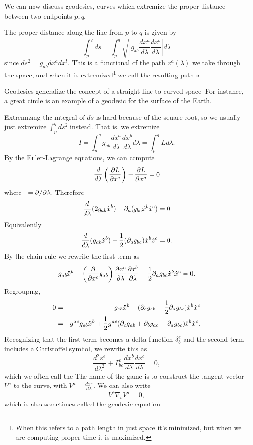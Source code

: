 We can now discuss geodesics, curves which extremize the proper distance between two endpoints $p,q$. 
\begin{defn}
The proper distance along the line from $p$ to $q$ is given by
$$\int_p^q ds = \int_p^q \sqrt{\left|g_{ab}\frac{dx^a}{d\lambda} \frac{dx^b}{d\lambda}\right|} d\lambda$$
since $ds^2=g_{ab} dx^a dx^b.$ This is a functional of the path $x^a(\lambda)$ we take through the space, and when it is extremized\footnote{When this refers to a path length in just space it's minimized, but when we are computing proper time it is maximized.} we call the resulting path a . 
\end{defn}
Geodesics generalize the concept of a straight line to curved space. For instance, a great circle is an example of a geodesic for the surface of the Earth.

Extremizing the integral of $ds$ is hard because of the square root, so we usually just extremize $\int_p^q ds^2$ instead. That is, we extremize
$$I=\int_p^q g_{ab}\frac{dx^a}{d\lambda} \frac{dx^b}{d\lambda} d\lambda= \int_p^q L d\lambda.$$
By the Euler-Lagrange equations, we can compute
$$\frac{d}{d\lambda} \left(\frac{\partial L}{\partial \dot x^a}\right)- \frac{\partial L}{\partial x^a}=0$$
where $\cdot = \partial/\partial\lambda.$
Therefore
$$\frac{d}{d\lambda}(2g_{ab}\dot x^{b}) -\partial_a (g_{bc} \dot x^b \dot x^c) =0$$
Equivalently
$$\frac{d}{d\lambda}(g_{ab}\dot x^b)-\frac{1}{2}(\partial_a g_{bc})\dot x^b \dot x^c =0.$$
By the chain rule we rewrite the first term as
$$g_{ab}\ddot x^b +\left(\frac{\partial}{\partial x^c}g_{ab}\right) \frac{\partial x^c}{\partial \lambda} \frac{\partial x^b}{\partial \lambda}-\frac{1}{2}\partial_a g_{bc} \dot x^b \dot x^c=0.$$
Regrouping,
\begin{eqnarray*}
0&=& g_{ab} \ddot x^b + (\partial_c g_{ab}-\frac{1}{2}\partial_a g_{bc})\dot x^b \dot x^c\\
&=& g^{ae}g_{ab} \ddot x^b +\frac{1}{2} g^{ae}(\partial_c g_{ab}+\partial_b g_{ac}-\partial_a g_{bc})\dot x^b \dot x^c.
\end{eqnarray*}
Recognizing that the first term becomes a delta function $\delta^e_b$ and the second term includes a Christoffel symbol, we rewrite this as
$$\frac{d^2x^e}{d\lambda^2}+\Gamma^e_{bc}\frac{dx^b}{d\lambda} \frac{dx^c}{d\lambda}=0,$$
which we often call the  The name of the game is to construct the tangent vector $V^a$ to the curve, with $V^a=\frac{dx^a}{d\lambda}.$
We can also write
$$V^b \nabla_b V^a = 0,$$
which is also sometimes called the geodesic equation.